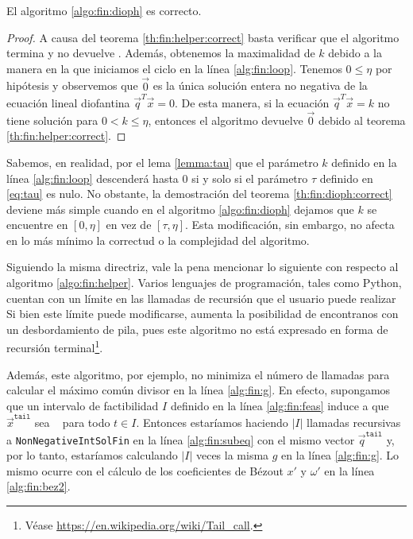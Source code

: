 \begin{theorem}
	\label{th:fin:dioph:correct}
	El algoritmo \ref{algo:fin:dioph} es correcto.
\end{theorem}
\begin{proof}
	A causa del teorema \ref{th:fin:helper:correct} basta verificar que el algoritmo termina y no
	devuelve \NIL. Además, obtenemos la maximalidad de $k$ debido a la manera en la que iniciamos el
	ciclo en la línea \ref{alg:fin:loop}. Tenemos $0 \leq \eta$ por hipótesis y observemos que
	$\vec{0}$ es la única solución entera no negativa de la ecuación lineal diofantina
	$\vec{q}^T\vec{x} = 0$. De esta manera, si la ecuación $\vec{q}^T\vec{x} = k$ no tiene solución
	para $0 < k \leq \eta$, entonces el algoritmo devuelve $\vec{0}$ debido al teorema
	\ref{th:fin:helper:correct}.
\end{proof}

Sabemos, en realidad, por el lema \ref{lemma:tau} que el parámetro $k$ definido en la línea
\ref{alg:fin:loop} descenderá hasta 0 si y solo si el parámetro $\tau$ definido en \eqref{eq:tau}
es nulo. No obstante, la demostración del teorema \ref{th:fin:dioph:correct} deviene más simple
cuando en el algoritmo \ref{algo:fin:dioph} dejamos que $k$ se encuentre en $[0, \eta]$ en vez de
$[\tau, \eta]$. Esta modificación, sin embargo, no afecta en lo más mínimo la correctud o la
complejidad del algoritmo.

Siguiendo la misma directriz, vale la pena mencionar lo siguiente con respecto al algoritmo
\ref{algo:fin:helper}. Varios lenguajes de programación, tales como Python, cuentan con un límite en
las llamadas de recursión que el usuario puede realizar Si bien este límite puede modificarse,
aumenta la posibilidad de encontranos con un desbordamiento de pila, pues este algoritmo no está
expresado en forma de recursión terminal\footnote{Véase \url{https://en.wikipedia.org/wiki/Tail_call}.}.

Además, este algoritmo, por ejemplo, no minimiza el número de llamadas para calcular el máximo común
divisor en la línea \ref{alg:fin:g}. En efecto, supongamos que un intervalo de factibilidad $I$
definido en la línea \ref{alg:fin:feas} induce a que $\vec{x}^{\texttt{tail}}$ sea \NIL~ para todo
$t \in I$. Entonces estaríamos haciendo $|I|$ llamadas recursivas a \texttt{NonNegativeIntSolFin} en
la línea \ref{alg:fin:subeq} con el mismo vector $\vec{q}^{\texttt{tail}}$ y, por lo tanto,
estaríamos calculando $|I|$ veces la misma $g$ en la línea \ref{alg:fin:g}. Lo mismo ocurre con el
cálculo de los coeficientes de Bézout $x'$ y $\omega'$ en la línea \ref{alg:fin:bez2}.

